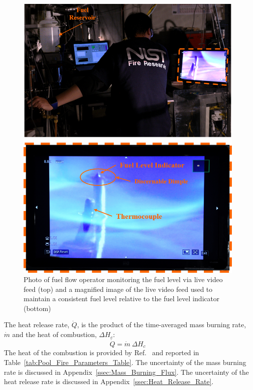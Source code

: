 \documentclass[12pt]{article}
\begin{document}
\begin{figure}[h!]
	\centering
\includegraphics[width=14.0cm,keepaspectratio]{Monitoring_Fuel_Level_A.png}
	\caption[Photo of fuel flow operator monitoring the fuel level via live video feed (top) and a magnified image of the live video feed used to maintain a consistent fuel level relative to the fuel level indicator (bottom)]{Photo of fuel flow operator monitoring the fuel level via live video feed (top) and a magnified image of the live video feed used to maintain a consistent fuel level relative to the fuel level indicator (bottom)}
	\label{fig:Fuel_Level}
\end{figure}



The heat release rate, $\dot{Q}$, is the product of the time-averaged mass burning rate, $\dot{m}$ and the heat of combustion, $\Delta H_{c}$:
\begin{equation}\label{eq:Heat_release_rate}
\dot{Q}= \dot{m}~\Delta H_{c}
\end{equation}
The heat of the combustion is provided by Ref.~\cite{Dippr} and reported in Table~\ref{tab:Pool_Fire_Parameters_Table}. The uncertainty of the mass burning rate is discussed in Appendix~\ref{ssec:Mass_Burning_Flux}. The uncertainty of the heat release rate is discussed in Appendix~\ref{ssec:Heat_Release_Rate}.
\end{document}
